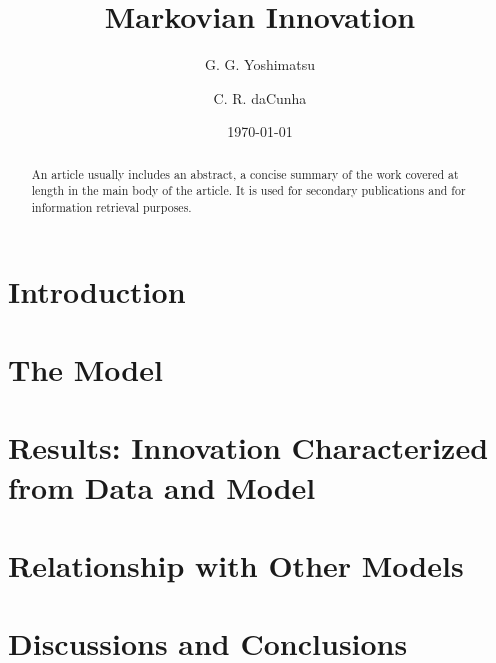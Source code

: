 \documentclass[%
 aip,
 amsmath,amssymb,
 reprint,%
]{revtex4-1}
\begin{document}

\title[Markovian Innovation]{Markovian Innovation}
\author{G. G. Yoshimatsu}
\author{ C. R. daCunha}%
%

\date{\today}%

\begin{abstract}
An article usually includes an abstract, a concise summary of the work
covered at length in the main body of the article. It is used for
secondary publications and for information retrieval purposes. 
\end{abstract}

\maketitle

\section{Introduction}


\section{The Model}


\section{Results: Innovation Characterized from Data and Model} 


\section{Relationship with Other Models}


\section{Discussions and Conclusions}




\end{document}
